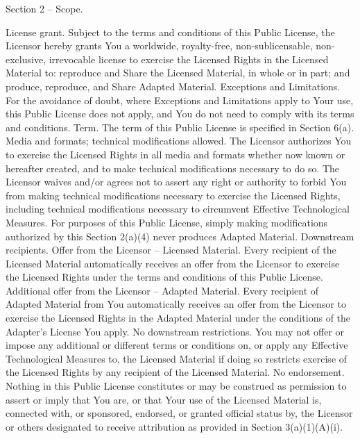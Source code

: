 Section 2 – Scope.

    License grant.
        Subject to the terms and conditions of this Public License, the Licensor hereby grants You a worldwide, royalty-free, non-sublicensable, non-exclusive, irrevocable license to exercise the Licensed Rights in the Licensed Material to:
            reproduce and Share the Licensed Material, in whole or in part; and
            produce, reproduce, and Share Adapted Material.
        Exceptions and Limitations. For the avoidance of doubt, where Exceptions and Limitations apply to Your use, this Public License does not apply, and You do not need to comply with its terms and conditions.
        Term. The term of this Public License is specified in Section 6(a).
        Media and formats; technical modifications allowed. The Licensor authorizes You to exercise the Licensed Rights in all media and formats whether now known or hereafter created, and to make technical modifications necessary to do so. The Licensor waives and/or agrees not to assert any right or authority to forbid You from making technical modifications necessary to exercise the Licensed Rights, including technical modifications necessary to circumvent Effective Technological Measures. For purposes of this Public License, simply making modifications authorized by this Section 2(a)(4) never produces Adapted Material.
        Downstream recipients.
            Offer from the Licensor – Licensed Material. Every recipient of the Licensed Material automatically receives an offer from the Licensor to exercise the Licensed Rights under the terms and conditions of this Public License.
            Additional offer from the Licensor – Adapted Material. Every recipient of Adapted Material from You automatically receives an offer from the Licensor to exercise the Licensed Rights in the Adapted Material under the conditions of the Adapter’s License You apply.
            No downstream restrictions. You may not offer or impose any additional or different terms or conditions on, or apply any Effective Technological Measures to, the Licensed Material if doing so restricts exercise of the Licensed Rights by any recipient of the Licensed Material.
        No endorsement. Nothing in this Public License constitutes or may be construed as permission to assert or imply that You are, or that Your use of the Licensed Material is, connected with, or sponsored, endorsed, or granted official status by, the Licensor or others designated to receive attribution as provided in Section 3(a)(1)(A)(i).

